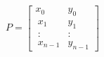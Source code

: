 \documentclass[10pt]{article}
\begin{document}
\begin{align*}P = \begin{bmatrix} x_{0} & y_{0} \\\ x_{1} & y_{1} \\\ : & : \\\ x_{n-1} & y_{n-1} \end{bmatrix}\end{align*}
\end{document}
